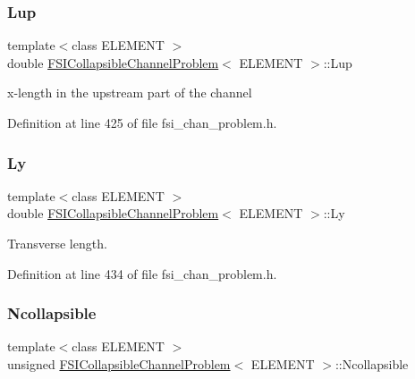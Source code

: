 \subsubsection{\texorpdfstring{Lup}{Lup}}
{\footnotesize\ttfamily template$<$class E\+L\+E\+M\+E\+NT $>$ \\
double \hyperlink{classFSICollapsibleChannelProblem}{F\+S\+I\+Collapsible\+Channel\+Problem}$<$ E\+L\+E\+M\+E\+NT $>$\+::Lup\hspace{0.3cm}{\ttfamily [protected]}}



x-\/length in the upstream part of the channel 



Definition at line 425 of file fsi\+\_\+chan\+\_\+problem.\+h.

\mbox{\label{classFSICollapsibleChannelProblem_adb381270408cea69b7290ff2aeb5928f}} 
\subsubsection{\texorpdfstring{Ly}{Ly}}
{\footnotesize\ttfamily template$<$class E\+L\+E\+M\+E\+NT $>$ \\
double \hyperlink{classFSICollapsibleChannelProblem}{F\+S\+I\+Collapsible\+Channel\+Problem}$<$ E\+L\+E\+M\+E\+NT $>$\+::Ly\hspace{0.3cm}{\ttfamily [protected]}}



Transverse length. 



Definition at line 434 of file fsi\+\_\+chan\+\_\+problem.\+h.

\mbox{\label{classFSICollapsibleChannelProblem_a3fb9656feb1c32045f4fdbd74f91258f}} 
\subsubsection{\texorpdfstring{Ncollapsible}{Ncollapsible}}
{\footnotesize\ttfamily template$<$class E\+L\+E\+M\+E\+NT $>$ \\
unsigned \hyperlink{classFSICollapsibleChannelProblem}{F\+S\+I\+Collapsible\+Channel\+Problem}$<$ E\+L\+E\+M\+E\+NT $>$\+::Ncollapsible\hspace{0.3cm}{\ttfamily [protected]}}



